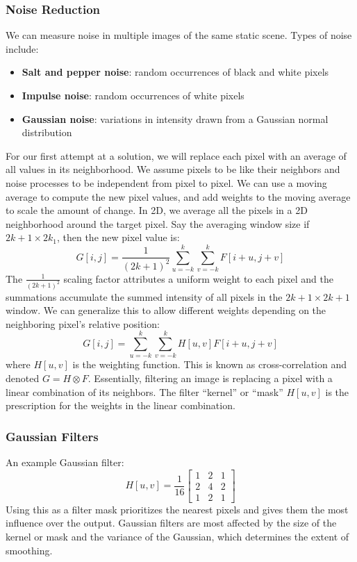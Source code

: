 \documentclass{math}
\begin{document}
\subsubsection*{Noise Reduction}
We can measure noise in multiple images of the same static scene. Types of noise
include:
\begin{itemize}
  \item \textbf{Salt and pepper noise}: random occurrences of black and white
    pixels
  \item \textbf{Impulse noise}: random occurrences of white pixels
  \item \textbf{Gaussian noise}: variations in intensity drawn from a Gaussian
    normal distribution
\end{itemize}
For our first attempt at a solution, we will replace each pixel with an average
of all values in its neighborhood. We assume pixels to be like their neighbors
and noise processes to be independent from pixel to pixel. We can use a moving
average to compute the new pixel values, and add weights to the moving average
to scale the amount of change. In 2D, we average all the pixels in a 2D
neighborhood around the target pixel. Say the averaging window size if
\( 2k+1\times 2k_1 \), then the new pixel value is:
\[ G[i,j] = \frac{1}{(2k+1)^2}\sum_{u=-k}^{k}\sum_{v=-k}^{k}F[i+u,j+v] \]
The \( \frac{1}{(2k+1)^2} \) scaling factor attributes a uniform weight to each
pixel and the summations accumulate the summed intensity of all pixels in the
\( 2k+1\times 2k+1 \) window. We can generalize this to allow different weights
depending on the neighboring pixel's relative position:
\[ G[i,j] = \sum_{u=-k}^{k}\sum_{v=-k}^{k}H[u,v]F[i+u,j+v] \]
where \( H[u,v] \) is the weighting function. This is known as cross-correlation
and denoted \( G = H\otimes F \). Essentially, filtering an image is replacing
a pixel with a linear combination of its neighbors. The filter ``kernel'' or
``mask'' \( H[u,v] \) is the prescription for the weights in the linear
combination.

\subsubsection*{Gaussian Filters}
An example Gaussian filter:
\[ H[u,v] = \frac{1}{16}\begin{bmatrix}
  1 & 2 & 1 \\
  2 & 4 & 2 \\
  1 & 2 & 1
\end{bmatrix} \]
Using this as a filter mask prioritizes the nearest pixels and gives them the
most influence over the output. Gaussian filters are most affected by the size
of the kernel or mask and the variance of the Gaussian, which determines the
extent of smoothing.
\end{document}

